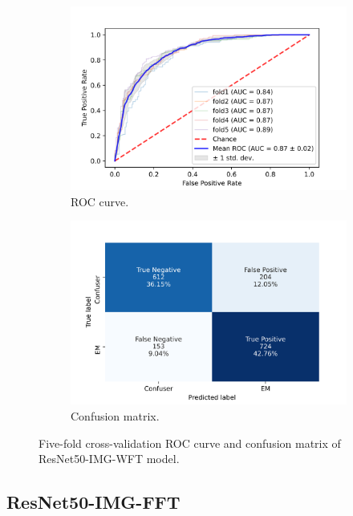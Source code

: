 \begin{figure}[h!]
	\centering
	\begin{subfigure}[b]{0.49\textwidth}
		\centering
		\includegraphics[width=\textwidth,keepaspectratio]{images/Supplement4/image42.png}
		\caption{ROC curve.}
	\end{subfigure}
	\hfill
	\begin{subfigure}[b]{0.49\textwidth}
		\centering
		\includegraphics[width=\textwidth,keepaspectratio]{images/Supplement4/image48.png}
		\caption{Confusion matrix.}
	\end{subfigure}
	\caption{Five-fold cross-validation ROC curve and confusion matrix of ResNet50-IMG-WFT model.}
\end{figure}

\vfill\clearpage
\subsection{ResNet50-IMG-FFT}

